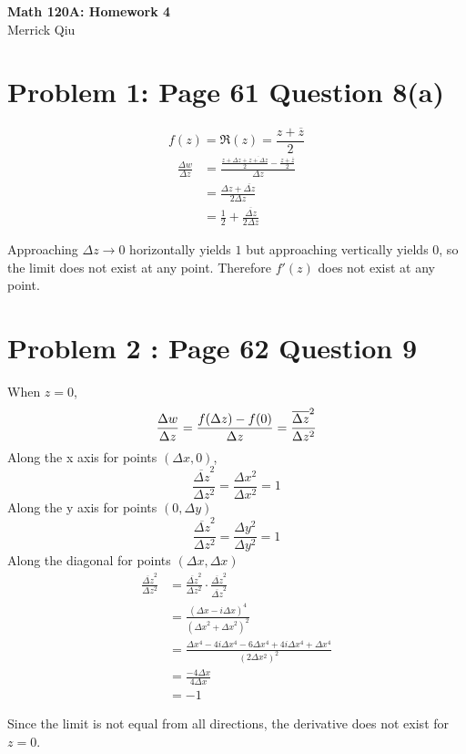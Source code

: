 \documentclass{article}
\newcommand{\cjg}[1]{\overline{#1}}
\begin{document}
\begin{center}
	\huge{\bf Math 120A: Homework 4} \\
	Merrick Qiu
\end{center}
\section*{Problem 1: Page 61 Question 8(a)}
\[
	f(z) = \Re(z) = \frac{z+\cjg{z}}{2}
\]
\begin{align*}
	\frac{\Delta w}{\Delta z} &= \frac{\frac{z+ \Delta z + \cjg{z + \Delta z}}{2} - \frac{z+\cjg{z}}{2}}{\Delta z} \\
	&= \frac{\Delta z + \cjg{\Delta z}}{2 \Delta z} \\
	&= \frac{1}{2} + \frac{\cjg{\Delta z}}{2 \Delta z}
\end{align*}

Approaching $\Delta z \to 0$ horizontally yields $1$
but approaching vertically yields $0$,
so the limit does not exist at any point.
Therefore $f'(z)$ does not exist at any point.
\newpage 

\section*{Problem 2 : Page 62 Question 9}
When $z = 0$,
\[
	\frac{\Delta w}{\Delta z} = \frac{f(\Delta z) - f(0)}{\Delta z} \\
	= \frac{\cjg{\Delta z}^2}{\Delta z^2}
\]
Along the x axis for points $(\Delta x, 0)$,
\[
	\frac{\cjg{\Delta z}^2}{\Delta z^2} =
	\frac{\Delta x^2}{\Delta x^2} =
	1
\]
Along the y axis for points $(0, \Delta y)$
\[
	\frac{\cjg{\Delta z}^2}{\Delta z^2} =
	\frac{\Delta y^2}{\Delta y^2} =
	1
\]
Along the diagonal for points $(\Delta x, \Delta x)$
\begin{align*}
	\frac{\cjg{\Delta z}^2}{\Delta z^2} &= \frac{\cjg{\Delta z}^2}{\Delta z^2} \cdot \frac{\cjg{\Delta z}^2}{\cjg{\Delta z}^2} \\
	&= \frac{(\Delta x - i \Delta x)^4}{({\Delta x}^2 + {\Delta x}^2)^2} \\
	&= \frac{\Delta x^4 - 4 i \Delta x^4 - 6\Delta x^4 + 4 i \Delta x^4 + \Delta x^4}{(2{\Delta x^2})^2} \\
	&= \frac{-4\Delta x}{4\Delta x} \\
	&= -1
\end{align*}

Since the limit is not equal from all directions, the derivative does not exist 
for $z = 0$.

\newpage 
\end{document}
